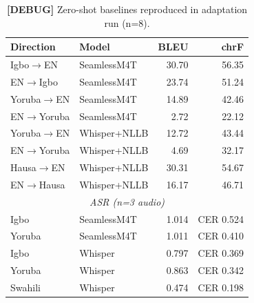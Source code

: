 
\begin{table}[t]
\centering
\small
\caption{\textbf{[DEBUG]} Zero-shot baselines reproduced in adaptation run (n=8).}
\label{tab:p2_debug_baseline}
\begin{tabular}{llrr}
\toprule
\textbf{Direction} & \textbf{Model} & \textbf{BLEU} & \textbf{chrF} \\
\midrule
Igbo$\to$EN   & SeamlessM4T  & 30.70 & 56.35 \\
EN$\to$Igbo   & SeamlessM4T  & 23.74 & 51.24 \\
Yoruba$\to$EN & SeamlessM4T  & 14.89 & 42.46 \\
EN$\to$Yoruba & SeamlessM4T  &  2.72 & 22.12 \\
Yoruba$\to$EN & Whisper+NLLB & 12.72 & 43.44 \\
EN$\to$Yoruba & Whisper+NLLB &  4.69 & 32.17 \\
Hausa$\to$EN  & Whisper+NLLB & 30.31 & 54.67 \\
EN$\to$Hausa  & Whisper+NLLB & 16.17 & 46.71 \\
\midrule
\multicolumn{4}{c}{\textit{ASR (n=3 audio)}} \\
\midrule
Igbo    & SeamlessM4T & 1.014 & CER 0.524 \\
Yoruba  & SeamlessM4T & 1.011 & CER 0.410 \\
Igbo    & Whisper     & 0.797 & CER 0.369 \\
Yoruba  & Whisper     & 0.863 & CER 0.342 \\
Swahili & Whisper     & 0.474 & CER 0.198 \\
\bottomrule
\end{tabular}
\end{table}
